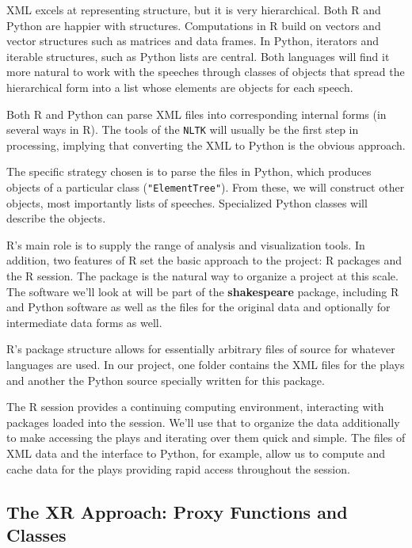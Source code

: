 \documentclass{article}
\begin{document}
XML excels at representing structure, but it is very
hierarchical. Both R and Python are happier with 
structures.
Computations in R build on vectors and vector
structures such as matrices and data frames.
In Python, iterators and iterable
structures, such as Python lists are central.
Both languages will find it more natural to work with the speeches
through classes of objects that spread the hierarchical form into a
list whose elements are objects for each speech.

Both R and Python can parse XML files into corresponding internal
forms (in several ways in R). The tools of the \texttt{NLTK} will
usually be the first step in processing, implying that converting the
XML to Python is the obvious approach.

The specific strategy chosen is to parse the files in Python, which
produces objects of a particular class (\texttt{"ElementTree"}). From
these, we will construct other objects, most importantly lists of
speeches. Specialized Python classes will describe the objects.

R's main role is to supply the range of analysis and visualization
tools. In addition, two features of R set the basic approach to the
project: R packages and the R session. The package is the natural way
to organize a project at this scale. The software we'll look at will
be part of the \textbf{shakespeare} package, including R and Python
software as well as the files for the original data and optionally for
intermediate data forms as well.

R's package structure allows for essentially arbitrary files of source
for whatever languages are used. In our project, one folder contains
the XML files for the plays and another the Python source specially
written for this package.

The R session provides a continuing computing environment, interacting
with packages loaded into the session. We'll use that to organize the
data additionally to make accessing the plays and iterating over them
quick and simple. The files of XML data and the interface to Python,
for example, allow us to compute and cache data for the plays
providing rapid access throughout the session.

\subsection{The XR Approach: Proxy Functions and
  Classes}\label{the-xr-approach-proxy-functions-and-classes}
\end{document}
